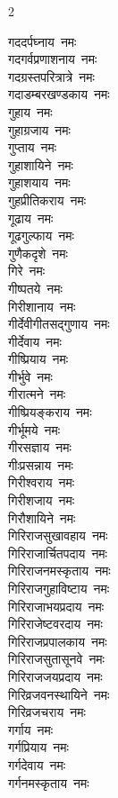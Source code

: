 \begin{multicols}{2}
\begin{flushleft}
गददर्पघ्नाय~नमः\\
गदगर्वप्रणाशनाय~नमः\\
गदग्रस्तपरित्रात्रे~नमः\\
गदाडम्बरखण्डकाय~नमः\hfill{}\\
गुहाय~नमः\\
गुहाग्रजाय~नमः\\
गुप्ताय~नमः\\
गुहाशायिने~नमः\\
गुहाशयाय~नमः\\
गुहप्रीतिकराय~नमः\\
गूढाय~नमः\\
गूढगुल्फाय~नमः\\
गुणैकदृशे~नमः\\
गिरे~नमः\hfill{}\\
गीष्पतये~नमः\\
गिरीशानाय~नमः\\
गीर्देवीगीतसद्गुणाय~नमः\\
गीर्देवाय~नमः\\
गीष्प्रियाय~नमः\\
गीर्भुवे~नमः\\
गीरात्मने~नमः\\
गीष्प्रियङ्कराय~नमः\\
गीर्भूमये~नमः\\
गीरसज्ञाय~नमः\hfill{}\\
गीःप्रसन्नाय~नमः\\
गिरीश्वराय~नमः\\
गिरीशजाय~नमः\\
गिरौशायिने~नमः\\
गिरिराजसुखावहाय~नमः\\
गिरिराजार्चितपदाय~नमः\\
गिरिराजनमस्कृताय~नमः\\
गिरिराजगुहाविष्टाय~नमः\\
गिरिराजाभयप्रदाय~नमः\\
गिरिराजेष्टवरदाय~नमः\hfill{}\\
गिरिराजप्रपालकाय~नमः\\
गिरिराजसुतासूनवे~नमः\\
गिरिराजजयप्रदाय~नमः\\
गिरिव्रजवनस्थायिने~नमः\\
गिरिव्रजचराय~नमः\\
गर्गाय~नमः\\
गर्गप्रियाय~नमः\\
गर्गदेवाय~नमः\\
गर्गनमस्कृताय~नमः\\

\end{flushleft}
\end{multicols}

